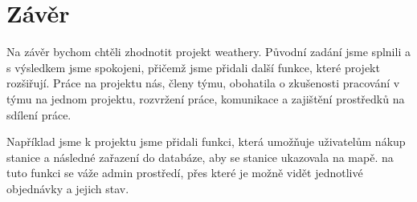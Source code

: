\section{Závěr}
Na závěr bychom chtěli zhodnotit projekt weathery. Původní zadání jsme splnili a s výsledkem jsme spokojeni, přičemž jsme přidali další funkce, které projekt rozšiřují.
Práce na projektu nás, členy týmu, obohatila o zkušenosti pracování v týmu na jednom projektu, rozvržení práce, komunikace a zajištění prostředků na sdílení práce.

Například jsme k projektu jsme přidali funkci, která umožňuje uživatelům nákup stanice a následné zařazení do databáze, aby se stanice ukazovala na mapě.
na tuto funkci se váže admin prostředí, přes které je možně vidět jednotlivé objednávky a jejich stav.

